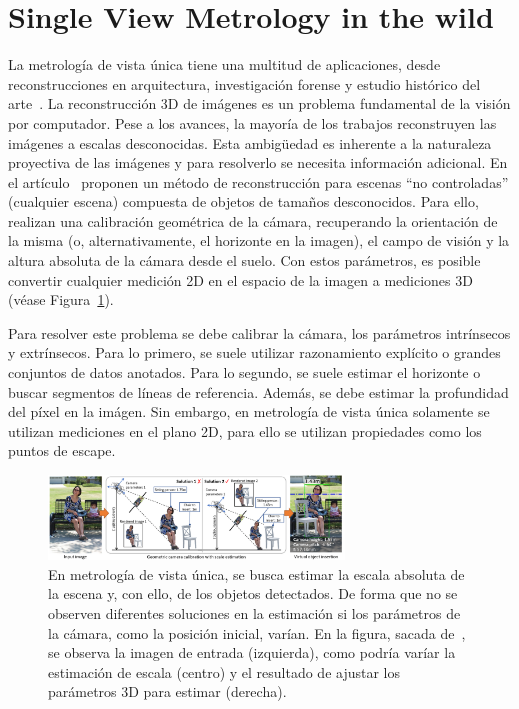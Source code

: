\documentclass[12pt,letterpaper]{article}
\begin{document}
\section{Single View Metrology in the wild}
La metrología de vista única tiene una multitud de aplicaciones, desde reconstrucciones en arquitectura, investigación forense y estudio histórico del arte~\cite{SingleViewMetrologyApplications}.
La reconstrucción 3D de imágenes es un problema fundamental de la visión por computador. Pese a los avances, la mayoría de los trabajos reconstruyen las imágenes a escalas desconocidas. Esta ambigüedad es inherente a 
la naturaleza proyectiva de las imágenes y para resolverlo se necesita información adicional. 
En el artículo~\cite{SingleViewMetrology} proponen un método de reconstrucción para escenas ``no controladas'' (cualquier escena) compuesta de objetos de tamaños desconocidos.
Para ello, realizan una calibración geométrica de la cámara, recuperando la orientación de la misma (o, alternativamente, el horizonte en la imagen), el campo de visión y la altura absoluta de la cámara desde el suelo.
Con estos parámetros, es posible convertir cualquier medición 2D en el espacio de la imagen a mediciones 3D (véase Figura~\ref{fig:ExampleObjectInsertion}).

Para resolver este problema se debe calibrar la cámara, los parámetros intrínsecos y extrínsecos. Para lo primero, 
se suele utilizar razonamiento explícito o grandes conjuntos de datos anotados. Para lo segundo, se suele estimar 
el horizonte o buscar segmentos de líneas de referencia. Además, se debe estimar la profundidad del píxel en 
la imágen. Sin embargo, en metrología de vista única solamente se utilizan mediciones en el plano 2D, para ello 
se utilizan propiedades como los puntos de escape.

\begin{figure}[!ht]
\begin{center}
    \includegraphics[width=0.7\textwidth]{ExampleObjectInsertion}
\end{center}
\caption{En metrología de vista única, se busca estimar la escala absoluta de la escena y, con ello, de los objetos detectados. De forma que no se observen diferentes soluciones en la estimación si los parámetros de la cámara, como la posición inicial, varían.
En la figura, sacada de~\cite{SingleViewMetrology}, se observa la imagen de entrada (izquierda), como podría varíar la estimación de escala (centro) y el resultado de ajustar los parámetros 3D para estimar (derecha).}
\label{fig:ExampleObjectInsertion}
\end{figure}
\end{document}
